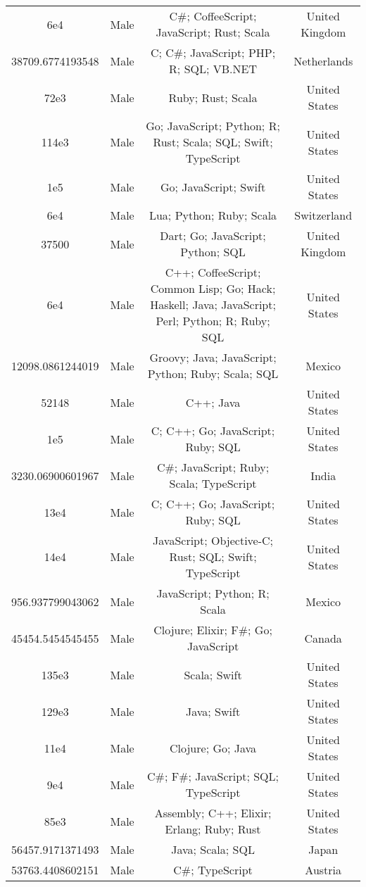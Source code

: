\begin{center}
\begin{tabular}{ |c|c|c|c| }
6e4  &  Male  &  C\#; CoffeeScript; JavaScript; Rust; Scala  &  United Kingdom  \\ 
38709.6774193548  &  Male  &  C; C\#; JavaScript; PHP; R; SQL; VB.NET  &  Netherlands  \\ 
72e3  &  Male  &  Ruby; Rust; Scala  &  United States  \\ 
114e3  &  Male  &  Go; JavaScript; Python; R; Rust; Scala; SQL; Swift; TypeScript  &  United States  \\ 
1e5  &  Male  &  Go; JavaScript; Swift  &  United States  \\ 
6e4  &  Male  &  Lua; Python; Ruby; Scala  &  Switzerland  \\ 
37500  &  Male  &  Dart; Go; JavaScript; Python; SQL  &  United Kingdom  \\ 
6e4  &  Male  &  C++; CoffeeScript; Common Lisp; Go; Hack; Haskell; Java; JavaScript; Perl; Python; R; Ruby; SQL  &  United States  \\ 
12098.0861244019  &  Male  &  Groovy; Java; JavaScript; Python; Ruby; Scala; SQL  &  Mexico  \\ 
52148  &  Male  &  C++; Java  &  United States  \\ 
1e5  &  Male  &  C; C++; Go; JavaScript; Ruby; SQL  &  United States  \\ 
3230.06900601967  &  Male  &  C\#; JavaScript; Ruby; Scala; TypeScript  &  India  \\ 
13e4  &  Male  &  C; C++; Go; JavaScript; Ruby; SQL  &  United States  \\ 
14e4  &  Male  &  JavaScript; Objective-C; Rust; SQL; Swift; TypeScript  &  United States  \\ 
956.937799043062  &  Male  &  JavaScript; Python; R; Scala  &  Mexico  \\ 
45454.5454545455  &  Male  &  Clojure; Elixir; F\#; Go; JavaScript  &  Canada  \\ 
135e3  &  Male  &  Scala; Swift  &  United States  \\ 
129e3  &  Male  &  Java; Swift  &  United States  \\ 
11e4  &  Male  &  Clojure; Go; Java  &  United States  \\ 
9e4  &  Male  &  C\#; F\#; JavaScript; SQL; TypeScript  &  United States  \\ 
85e3  &  Male  &  Assembly; C++; Elixir; Erlang; Ruby; Rust  &  United States  \\ 
56457.9171371493  &  Male  &  Java; Scala; SQL  &  Japan  \\ 
53763.4408602151  &  Male  &  C\#; TypeScript  &  Austria  \\ 

\end{tabular}
\end{center}
